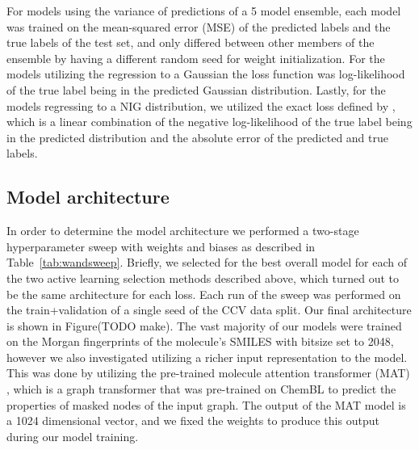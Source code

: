 \documentclass[journal=jmcmar,manuscript=article]{achemso}
\begin{document}
For models using the variance of predictions of a 5 model ensemble, each model was trained on the mean-squared error (MSE) of the predicted labels and the true labels of the test set, and only differed between other members of the ensemble by having a different random seed for weight initialization. For the models utilizing the regression to a Gaussian the loss function was log-likelihood of the true label being in the predicted Gaussian distribution. Lastly, for the models regressing to a NIG distribution, we utilized the exact loss defined by \citet{alnigregress}, which is a linear combination of the negative log-likelihood of the true label being in the predicted distribution and the absolute error of the predicted and true labels.

\subsection{Model architecture}
In order to determine the model architecture we performed a two-stage hyperparameter sweep with weights and biases\cite{wandb} as described in Table~\ref{tab:wandsweep}. Briefly, we selected for the best overall model for each of the two active learning selection methods described above, which turned out to be the same architecture for each loss. Each run of the sweep was performed on the train+validation of a single seed of the CCV data split. Our final architecture is shown in Figure(TODO make). The vast majority of our models were trained on the Morgan fingerprints of the molecule's SMILES with bitsize set to 2048, however we also investigated utilizing a richer input representation to the model. This was done by utilizing the pre-trained molecule attention transformer (MAT) \cite{MAT}, which is a graph transformer that was pre-trained on ChemBL\cite{Chembl} to predict the properties of masked nodes of the input graph. The output of the MAT model is a 1024 dimensional vector, and we fixed the weights to produce this output during our model training.
\end{document}
